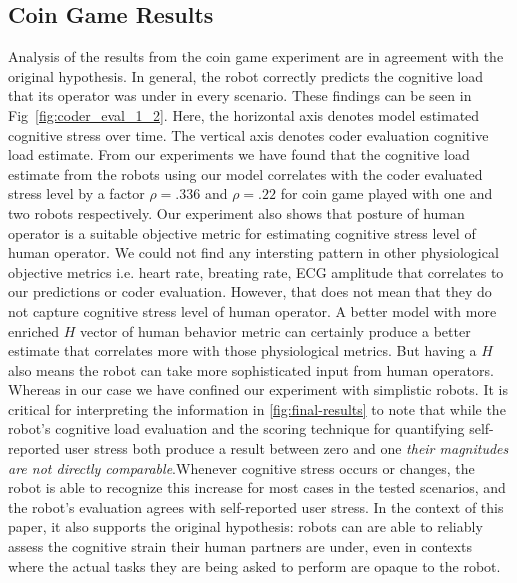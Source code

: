 \documentclass{sig-alternate}
\begin{document}

\subsection{Coin Game Results}

Analysis of the results from the coin game experiment are in agreement
with the original hypothesis. In general, the robot correctly predicts
the cognitive load that its operator was under in every
scenario. These findings can be seen in Fig~\ref{fig:coder_eval_1_2}.
Here, the horizontal axis denotes model estimated cognitive stress over time. The vertical axis denotes coder evaluation cognitive load estimate. From our experiments we have found that the cognitive load estimate from the robots using our model correlates with the coder evaluated stress level by a factor $\rho=.336$ and $\rho=.22$ for coin game played with one and two robots respectively. Our experiment also shows that posture of human operator is a suitable objective metric for estimating cognitive stress level of human operator. We could not find any intersting pattern in other physiological objective metrics i.e. heart rate, breating rate, ECG amplitude that correlates to our predictions or coder evaluation. However, that does not mean that they do not capture cognitive stress level of human operator. A better model with more enriched $H$ vector of human behavior metric can certainly produce a better estimate that correlates more with those physiological metrics. But having a $H$ also means the robot can take more sophisticated input from human operators. Whereas in our case we have confined our experiment with simplistic robots.
It is critical for interpreting the information in \ref{fig:final-results} to note that while the robot's cognitive load evaluation and the scoring technique for quantifying
self-reported user stress both produce a result between zero and one
\textit{their magnitudes are not directly comparable}.Whenever cognitive stress occurs or changes, the robot is able to recognize this increase for most cases in the
tested scenarios, and the robot's evaluation agrees with self-reported
user stress.  In the context of this paper, it also supports the
original hypothesis: robots can are able to reliably assess the
cognitive strain their human partners are under, even in contexts
where the actual tasks they are being asked to perform are opaque to
the robot.
\end{document}
